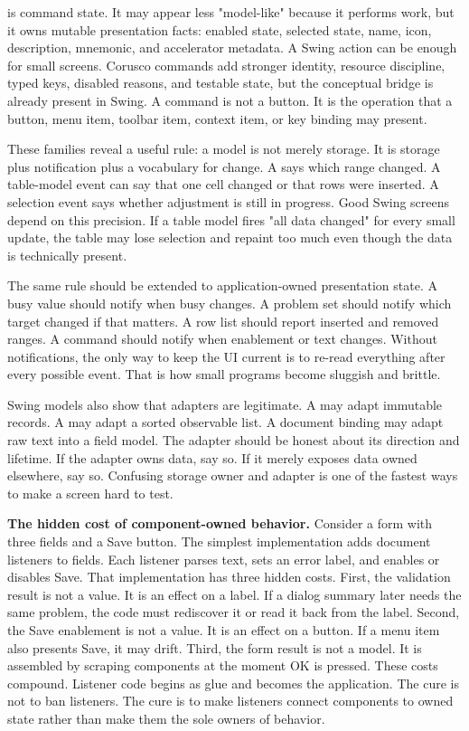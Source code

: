  is command state. It may appear less "model-like" because it performs work, but it owns mutable presentation facts: enabled state, selected state, name, icon, description, mnemonic, and accelerator metadata. A Swing action can be enough for small screens. Corusco commands add stronger identity, resource discipline, typed keys, disabled reasons, and testable state, but the conceptual bridge is already present in Swing. A command is not a button. It is the operation that a button, menu item, toolbar item, context item, or key binding may present.

These families reveal a useful rule: a model is not merely storage. It is storage plus notification plus a vocabulary for change. A  says which range changed. A table-model event can say that one cell changed or that rows were inserted. A selection event says whether adjustment is still in progress. Good Swing screens depend on this precision. If a table model fires "all data changed" for every small update, the table may lose selection and repaint too much even though the data is technically present.

The same rule should be extended to application-owned presentation state. A busy value should notify when busy changes. A problem set should notify which target changed if that matters. A row list should report inserted and removed ranges. A command should notify when enablement or text changes. Without notifications, the only way to keep the UI current is to re-read everything after every possible event. That is how small programs become sluggish and brittle.

Swing models also show that adapters are legitimate. A  may adapt immutable records. A  may adapt a sorted observable list. A document binding may adapt raw text into a field model. The adapter should be honest about its direction and lifetime. If the adapter owns data, say so. If it merely exposes data owned elsewhere, say so. Confusing storage owner and adapter is one of the fastest ways to make a screen hard to test.

\textbf{The hidden cost of component-owned behavior.} Consider a form with three fields and a Save button. The simplest implementation adds document listeners to fields. Each listener parses text, sets an error label, and enables or disables Save. That implementation has three hidden costs. First, the validation result is not a value. It is an effect on a label. If a dialog summary later needs the same problem, the code must rediscover it or read it back from the label. Second, the Save enablement is not a value. It is an effect on a button. If a menu item also presents Save, it may drift. Third, the form result is not a model. It is assembled by scraping components at the moment OK is pressed. These costs compound. Listener code begins as glue and becomes the application. The cure is not to ban listeners. The cure is to make listeners connect components to owned state rather than make them the sole owners of behavior.


